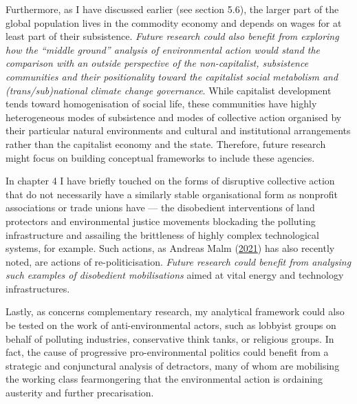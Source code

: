 \documentclass[a4paper, nobind]{templates/ociamthesis}
\begin{document}
Furthermore, as I have discussed earlier (see section 5.6), the larger part of the global population lives in the commodity economy and depends on wages for at least part of their subsistence. \emph{Future research could also benefit from exploring how the ``middle ground'' analysis of environmental action would stand the comparison with an outside perspective of the non-capitalist, subsistence communities and their positionality toward the capitalist social metabolism and (trans/sub)national climate change governance}. While capitalist development tends toward homogenisation of social life, these communities have highly heterogeneous modes of subsistence and modes of collective action organised by their particular natural environments and cultural and institutional arrangements rather than the capitalist economy and the state. Therefore, future research might focus on building conceptual frameworks to include these agencies.

In chapter 4 I have briefly touched on the forms of disruptive collective action that do not necessarily have a similarly stable organisational form as nonprofit associations or trade unions have --- the disobedient interventions of land protectors and environmental justice movements blockading the polluting infrastructure and assailing the brittleness of highly complex technological systems, for example. Such actions, as Andreas Malm (\protect\hyperlink{ref-malm_how_2021}{2021}) has also recently noted, are actions of re-politicisation. \emph{Future research could benefit from analysing such examples of disobedient mobilisations} aimed at vital energy and technology infrastructures.

Lastly, as concerns complementary research, my analytical framework could also be tested on the work of anti-environmental actors, such as lobbyist groups on behalf of polluting industries, conservative think tanks, or religious groups. In fact, the cause of progressive pro-environmental politics could benefit from a strategic and conjunctural analysis of detractors, many of whom are mobilising the working class fearmongering that the environmental action is ordaining austerity and further precarisation.
\end{document}
